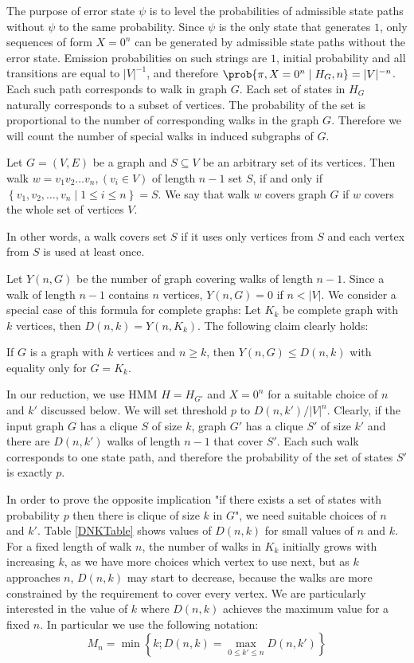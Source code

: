 The purpose of error state $\psi$ is to level the probabilities of admissible
state paths without $\psi$ to the same probability. Since $\psi$ is the only
state that generates $1$, only sequences of form $X=0^n$ can be generated by
admissible state paths without the error state. Emission probabilities on such
strings are $1$, initial probability and all transitions are equal to
$|V|^{-1}$, and therefore $\prob{\pi, X=0^n\mid H_G,n} = |V|^{-n}$.  Each such
path corresponds to walk in graph $G$. Each set of states in $H_G$ naturally
corresponds to a subset of vertices. The probability of the set is proportional
to the number of corresponding walks in the graph $G$. Therefore we will count
the number of special walks in induced subgraphs of $G$.

\begin{definition}
Let $G=(V, E)$ be a graph and $S\subseteq V$ be an arbitrary set of its
vertices.  Then walk $w=v_1v_2\dots v_n, (v_i\in V)$ of length $n-1$
 set $S$, if and only if $\left\{v_1, v_2, \dots, v_n\mid
1\leq i\leq n\right\}=S$.  We say that walk $w$ covers graph $G$ if $w$ covers
the whole set of vertices $V$.

\end{definition}
In other words, a walk covers set $S$ if it uses only vertices from $S$ and each
vertex from $S$ is used at least once.

Let $Y(n, G)$ be the number of graph covering walks of length $n-1$. Since a walk
of length $n - 1$ contains $n$ vertices, $Y(n, G)=0$ if $n<|V|$. We consider a
special case of this formula for complete graphs: Let $K_k$ be
complete graph with $k$ vertices, then $D(n, k) = Y(n, K_k)$. The following claim
clearly holds:

\begin{lemma}\label{NotCliqueIsSmaller}
If $G$ is a graph with $k$ vertices and $n\ge k$, then
$Y(n,G)\le D(n,k)$ with equality only for $G=K_k$. 
\end{lemma}

In our reduction, we use HMM $H=H_{G'}$ and $X=0^n$ for a suitable choice of
$n$ and $k'$ discussed below. We will set threshold $p$ to $D(n,k')/|V|^{n}$.
Clearly, if the input graph $G$ has a clique $S$ of size $k$, graph $G'$ has a
clique $S'$ of size $k'$ and there are $D(n,k')$ walks of length $n-1$ that cover
$S'$. Each such walk corresponds to one state path, and therefore the
probability of the set of states $S'$ is exactly $p$. 

In order to prove the opposite implication "if there exists a set of states with
probability $p$ then there is clique of size $k$ in $G$", we need suitable choices
of $n$ and $k'$. Table \ref{DNKTable} shows values of $D(n,k)$ for
small values of $n$ and $k$. For a fixed length of walk $n$, the
number of walks in $K_k$ initially grows with increasing $k$, as we
have more choices which vertex to use next, but as $k$ approaches $n$,
$D(n,k)$  may start to decrease, because the walks are more constrained by
the requirement to cover every vertex. We are particularly interested in
the value of $k$ where $D(n,k)$ achieves the maximum value for a fixed $n$. 
In particular we use the following notation:
$$M_{n} = \min\left\{k ; D(n,k) = \max_{0\leq k'\leq
  n}D(n,k')\right\}$$
  
